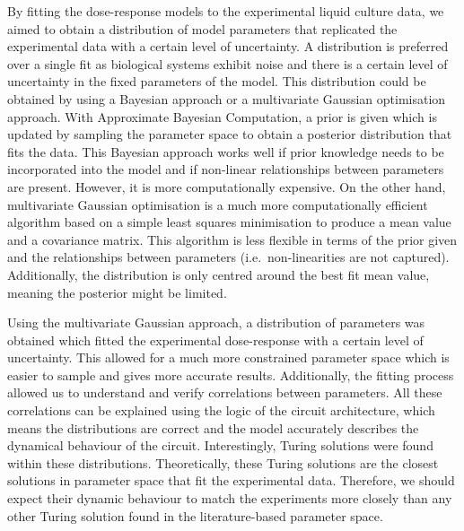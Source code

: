 By fitting the dose-response models to the experimental liquid culture data, we aimed to obtain a distribution of model parameters that replicated the experimental data with a certain level of uncertainty.
A distribution is preferred over a single fit as biological systems exhibit noise and there is a certain level of uncertainty in the fixed parameters of the model.
This distribution could be obtained by using a Bayesian approach or a multivariate Gaussian optimisation approach.
With Approximate Bayesian Computation, a prior is given which is updated by sampling the parameter space to obtain a posterior distribution that fits the data.
This Bayesian approach works well if prior knowledge needs to be incorporated into the model and if non-linear relationships between parameters are present.
However, it is more computationally expensive.
On the other hand, multivariate Gaussian optimisation is a much more computationally efficient algorithm based on a simple least squares minimisation to produce a mean value and a covariance matrix.
This algorithm is less flexible in terms of the prior given and the relationships between parameters (i.e.~non-linearities are not captured).
Additionally, the distribution is only centred around the best fit mean value, meaning the posterior might be limited.

Using the multivariate Gaussian approach, a distribution of parameters was obtained
which fitted the experimental dose-response with a certain level of uncertainty.
This allowed for a much more constrained parameter space which is easier to sample and gives more accurate results.
Additionally, the fitting process allowed us to understand and verify correlations between parameters.
All these correlations can be explained using the logic of the circuit architecture, which means the distributions are correct and the model accurately describes the dynamical behaviour of the circuit.
Interestingly, Turing solutions were found within these distributions.
Theoretically, these Turing solutions are the closest solutions in parameter space that fit the experimental data.
Therefore, we should expect their dynamic behaviour to match the experiments more closely than any other Turing solution found in the literature-based parameter space.

